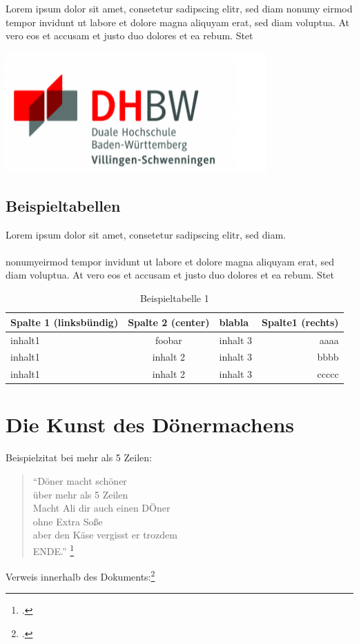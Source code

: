 Lorem ipsum dolor sit amet, consetetur sadipscing elitr, sed diam nonumy eirmod tempor invidunt ut labore et dolore magna aliquyam erat, sed diam voluptua. At vero eos et accusam et justo duo dolores et ea rebum. Stet
\begin{center}
	\includegraphics[width=10cm]{bilder/institute_logo.png}
\end{center}


\clearpage

\subsection{Beispieltabellen}
Lorem ipsum dolor sit amet, consetetur sadipscing elitr, sed diam.\\\\
 nonumyeirmod tempor invidunt ut labore et dolore magna aliquyam erat, sed diam voluptua. At vero eos et accusam et justo duo dolores et ea rebum. Stet


\begin{table}[h]
\begin{tabularx}{\textwidth}{|l|c|X|r|}
	\hline
	\textbf{Spalte 1} (linksbündig) & \textbf{Spalte 2} (center) &
	blabla & \textbf{Spalte1} (rechts) \\
	\hline
	\hline
	inhalt1 & foobar & inhalt 3 & aaaa \\
	\hline
	inhalt1 & inhalt 2 & inhalt 3 & bbbb \\
	\hline
	inhalt1 & inhalt 2 & inhalt 3 & ccccc \\
	\hline
\end{tabularx}
\caption{Beispieltabelle 1}
\end{table}


\section{Die Kunst des Dönermachens}

Beispielzitat bei mehr als 5 Zeilen:
\begin{quote}
"`Döner macht schöner\\
über mehr als 5 Zeilen\\
Macht Ali dir auch einen DÖner \\
ohne Extra Soße \\
aber den Käse vergisst er trozdem\\
ENDE."'
\footcite[Wörtlich übernommen von Ali]{praxishandbuch:bpmn2}
\end{quote}
Verweis innerhalb des Dokuments:\footcite[Vgl. \ref{Referenz} auf Seite 
\pageref{Referenz} ]{empty}


